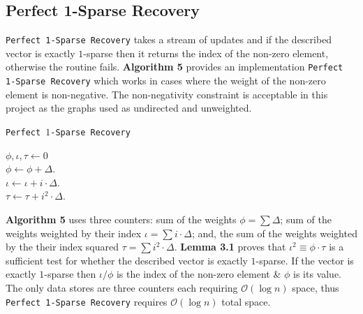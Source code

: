 \documentclass[11pt,twoside,a4paper]{report}
\begin{document}
\subsection{Perfect 1-Sparse Recovery}

\par \texttt{Perfect 1-Sparse Recovery} takes a stream of updates and if the described vector is exactly $1$-sparse then it returns the index of the non-zero element, otherwise the routine fails. \textbf{Algorithm 5} provides an implementation \texttt{Perfect 1-Sparse Recovery} which works in cases where the weight of the non-zero element is non-negative. The non-negativity constraint is acceptable in this project as the graphs used as undirected and unweighted.

\begin{algorithm}
	\caption{\texttt{Perfect $1$-Sparse Recovery}}
	$\phi,\iota,\tau\leftarrow0$\\
	 {
		$\phi\leftarrow\phi+\Delta$.\\
		$\iota\leftarrow\iota+i\cdot\Delta$.\\
		$\tau\leftarrow\tau+i^2\cdot\Delta$.\\
	}
\end{algorithm}

\textbf{Algorithm 5} uses three counters: sum of the weights $\phi=\sum\Delta$; sum of the weights weighted by their index $\iota=\sum i\cdot\Delta$; and, the sum of the weights weighted by the their index squared $\tau=\sum i^2\cdot\Delta$. \textbf{Lemma 3.1} proves that $\iota^2\equiv\phi\cdot\tau$ is a sufficient test for whether the described vector is exactly $1$-sparse. If the vector is exactly $1$-sparse then $\iota/\phi$ is the index of the non-zero element \& $\phi$ is its value. The only data stores are three counters each requiring $\mathcal{O}(\log n)$ space, thus \texttt{Perfect 1-Sparse Recovery} requires $\mathcal{O}(\log n)$ total space.
\end{document}
